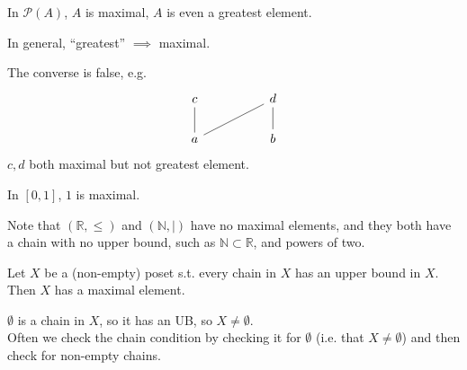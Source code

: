 \begin{example}
    In $\mathcal{P}(A)$, $A$ is maximal, $A$ is even a greatest element.
\end{example}

\begin{note}
    In general, ``greatest'' $\implies$ maximal.

    The converse is false, e.g.
    \[\begin{tikzcd}
        c && d \\
        a && b
        \arrow[no head, from=2-1, to=1-1]
        \arrow[no head, from=2-3, to=1-3]
        \arrow[no head, from=2-1, to=1-3]
    \end{tikzcd}\]
    $c, d$ both maximal but not greatest element.
\end{note}

\begin{example}
    In $[0,1]$, $1$ is maximal.
\end{example}

Note that $(\mathbb R, \leq)$ and $(\mathbb N, \mid)$ have no maximal elements, and they both have a chain with no upper bound, such as $\mathbb N \subset \mathbb R$, and powers of two.

\begin{theorem}
    Let $X$ be a (non-empty) poset s.t. every chain in $X$ has an upper bound in $X$.
    Then $X$ has a maximal element.
\end{theorem}

\begin{remark}
    $\emptyset$ is a chain in $X$, so it has an UB, so $X \neq \emptyset$. \\
    Often we check the chain condition by checking it for $\emptyset$ (i.e. that $X \neq \emptyset$) and then check for non-empty chains.
\end{remark}



